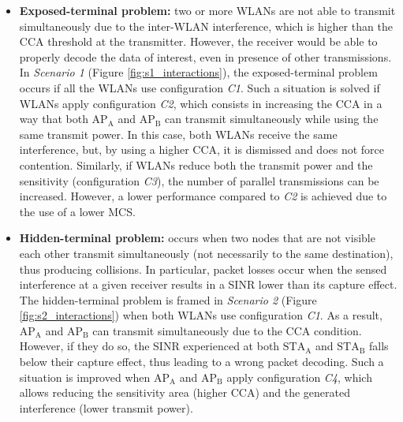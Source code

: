 \documentclass{article}
\begin{document}
\begin{itemize}		
	\item \textbf{Exposed-terminal problem:} two or more WLANs are not able to transmit simultaneously due to the inter-WLAN interference, which is higher than the CCA threshold at the transmitter. However, the receiver would be able to properly decode the data of interest, even in presence of other transmissions. In \emph{Scenario 1} (Figure \ref{fig:s1_interactions}), the exposed-terminal problem occurs if all the WLANs use configuration \emph{C1}. Such a situation is solved if WLANs apply configuration \emph{C2}, which consists in increasing the CCA in a way that both $\text{AP}_\text{A}$ and $\text{AP}_\text{B}$ can transmit simultaneously while using the same transmit power. In this case, both WLANs receive the same interference, but, by using a higher CCA, it is dismissed and does not force contention. Similarly, if WLANs reduce both the transmit power and the sensitivity (configuration \emph{C3}), the number of parallel transmissions can be increased. However, a lower performance compared to \emph{C2} is achieved due to the use of a lower MCS.		
	\item \textbf{Hidden-terminal problem:} occurs when two nodes that are not visible each other transmit simultaneously (not necessarily to the same destination), thus producing collisions. In particular, packet losses occur when the sensed interference at a given receiver results in a SINR lower than its capture effect. The hidden-terminal problem is framed in \emph{Scenario 2} (Figure \ref{fig:s2_interactions}) when both WLANs use configuration \emph{C1}. As a result, $\text{AP}_\text{A}$ and $\text{AP}_\text{B}$ can transmit simultaneously due to the CCA condition. However, if they do so, the SINR experienced at both $\text{STA}_\text{A}$ and $\text{STA}_\text{B}$ falls below their capture effect, thus leading to a wrong packet decoding. Such a situation is improved when $\text{AP}_\text{A}$ and $\text{AP}_\text{B}$ apply configuration \emph{C4}, which allows reducing the sensitivity area (higher CCA) and the generated interference (lower transmit power).		

\end{itemize}
\end{document}
